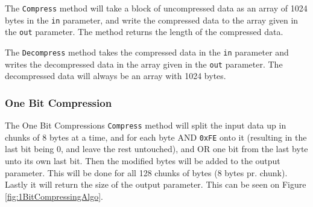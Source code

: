 The \texttt{Compress} method will take a block of uncompressed data as an array of 1024 bytes in the \texttt{in} parameter, and write the compressed data to the array given in the \texttt{out} parameter. The method returns the length of the compressed data.

The \texttt{Decompress} method takes the compressed data in the \texttt{in} parameter and writes the decompressed data in the array given in the \texttt{out} parameter.
The decompressed data will always be an array with 1024 bytes.


\subsubsection{One Bit Compression}
The One Bit Compressions \texttt{Compress} method will split the input data up in chunks of 8 bytes at a time, and for each byte AND \texttt{0xFE} onto it (resulting in the last bit being 0, and leave the rest untouched), and OR one bit from the last byte unto its own last bit.
Then the modified bytes will be added to the output parameter.
This will be done for all 128 chunks of bytes (8 bytes pr. chunk).
Lastly it will return the size of the output parameter.
This can be seen on Figure \ref{fig:1BitCompressingAlgo}.

